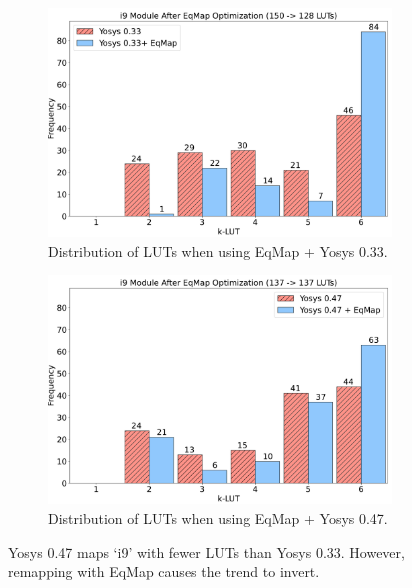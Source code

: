 \begin{figure}
    \begin{subfigure}{0.47\textwidth}
        \centering
        \includegraphics[width=\textwidth]{img/y33.pdf}
        \caption{Distribution of LUTs when using EqMap + Yosys 0.33.}\label{fig:histogram:y33}
    \end{subfigure}
    \hfill\vspace{4mm}
    \begin{subfigure}{0.47\textwidth}
        \centering
        \includegraphics[width=\textwidth]{img/y47.pdf}
        \caption{Distribution of LUTs when using EqMap + Yosys 0.47.}\label{fig:histogram:y47}
    \end{subfigure}
    \caption{Yosys 0.47 maps `i9' with fewer LUTs than Yosys 0.33. However, remapping with EqMap causes the trend to invert.}\label{fig:histogram}
\end{figure}


